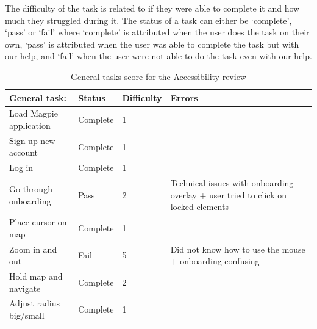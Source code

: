 \noindent The difficulty of the task is related to if they were able to complete it and how much they struggled during it. The status of a task can either be `complete', `pass' or `fail' where `complete' is attributed when the user does the task on their own, `pass' is attributed when the user was able to complete the task but with our help, and `fail' when the user were not able to do the task even with our help. \\
\begin{table}[h!]
    \centering
    \caption{General tasks score for the Accessibility review}
    \begin{tabular}{|p{}|p{}|p{}|p{}|}
        \hline
        \textbf{General task:}           & \textbf{Status} & \textbf{Difficulty} & \textbf{Errors}                                                                   \\
        \hline
        Load Magpie application          & Complete        & 1                   &                                                                                   \\
        \hline
        Sign up new account              & Complete        & 1                   &                                                                                   \\
        \hline
        Log in                           & Complete        & 1                   &                                                                                   \\
        \hline
        Go through onboarding            & Pass            & 2                   & Technical issues with onboarding overlay + user tried to click on locked elements \\
        \hline
        Place cursor on map              & Complete        & 1                   &                                                                                   \\
        \hline
        Zoom in and out                  & Fail            & 5                   & Did not know how to use the mouse + onboarding confusing                          \\
        \hline
        Hold map and navigate            & Complete        & 2                   &                                                                                   \\
        \hline
        Adjust radius big/small          & Complete        & 1                   &                                                                                   \\

\end{tabular}
\end{table}
